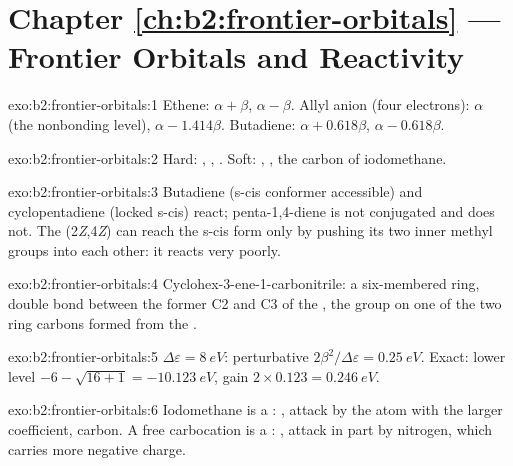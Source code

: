 \section*{Chapter \ref{ch:b2:frontier-orbitals} --- Frontier Orbitals and Reactivity}

\begin{solution}{exo:b2:frontier-orbitals:1}
Ethene:  $\alpha + \beta$,  $\alpha - \beta$. Allyl anion (four electrons):  $\alpha$ (the
nonbonding level),  $\alpha - 1.414\beta$. Butadiene:  $\alpha + 0.618\beta$,  $\alpha -
0.618\beta$.
\end{solution}

\begin{solution}{exo:b2:frontier-orbitals:2}
Hard: , , . Soft: , , the carbon of iodomethane.
\end{solution}

\begin{solution}{exo:b2:frontier-orbitals:3}
Butadiene (s-cis conformer accessible) and cyclopentadiene (locked s-cis) react;
penta-1,4-diene is not conjugated and does not. The (2\textit{Z},4\textit{Z})  can
reach the s-cis form only by pushing its two inner methyl groups into each other: it
reacts very poorly.
\end{solution}

\begin{solution}{exo:b2:frontier-orbitals:4}
Cyclohex-3-ene-1-carbonitrile: a six-membered ring, double bond between the former C2
and C3 of the , the  group on one of the two ring carbons formed from the
.
\end{solution}

\begin{solution}{exo:b2:frontier-orbitals:5}
$\Delta\varepsilon = \qty{8}{eV}$: perturbative $2\beta^2/\Delta\varepsilon = \qty{0.25}{eV}$. Exact: lower level
$-6 - \sqrt{16 + 1} = \qty{-10.123}{eV}$, gain $2 \times 0.123 = \qty{0.246}{eV}$.
\end{solution}

\begin{solution}{exo:b2:frontier-orbitals:6}
Iodomethane is a : , attack by the atom with the larger
 coefficient, carbon. A free carbocation is a : ,
attack in part by nitrogen, which carries more negative charge.
\end{solution}


